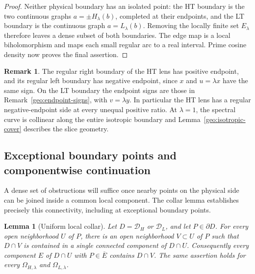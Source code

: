 \documentclass[11pt]{article}
\numberwithin{equation}{section}
\newtheorem{lemma}[theorem]{Lemma}
\theoremstyle{definition}
\newtheorem{remark}[theorem]{Remark}
\renewcommand{\DH}{\mathcal D_H}
\newcommand{\DL}{\mathcal D_L}
\begin{document}
\begin{proof}
Neither physical boundary has an isolated point:
the HT boundary is the two continuous graphs
\(a=\pm H_\lambda(b)\), completed at their endpoints,
and the LT boundary is the continuous graph
\(a=L_\lambda(b)\).
Removing the locally finite set \(E_\lambda\)
therefore leaves a dense subset of both boundaries.
The edge map is a local biholomorphism and maps each
small regular arc to a real interval.  Prime cosine
density now proves the final assertion.
\end{proof}

\begin{remark}\label{geo:slice-signs}
The regular right boundary of the HT lens has positive
endpoint, and its regular left boundary has negative
endpoint, since \(x\) and \(u=\lambda x\) have the
same sign.  On the LT boundary the endpoint signs
are those in Remark~\ref{geo:endpoint-signs}, with
\(v=\lambda y\). In particular the HT lens has a regular
negative-endpoint side at every unequal positive ratio.
At \(\lambda=1\), the spectral curve is collinear along the
entire isotropic boundary and Lemma~\ref{geo:isotropic-cover}
describes the slice geometry.
\end{remark}

\subsection{Exceptional boundary points and componentwise continuation}
\label{geo:continuation-section}

A dense set of obstructions will suffice once nearby points on the
physical side can be joined inside a common local component. The
collar lemma establishes precisely this connectivity, including at
exceptional boundary points.

\begin{lemma}[Uniform local collar]\label{geo:collar}
Let \(D=\DH\) or \(\DL\), and let \(P\in\partial D\).
For every open neighborhood \(U\) of \(P\), there is
an open neighborhood \(V\subset U\) of \(P\) such
that \(D\cap V\) is contained in a single connected
component of \(D\cap U\).
Consequently every component \(E\) of \(D\cap U\)
with \(P\in\overline E\) contains \(D\cap V\).
The same assertion holds for every
\(\Omega_{H,\lambda}\) and \(\Omega_{L,\lambda}\).
\end{lemma}
\end{document}
